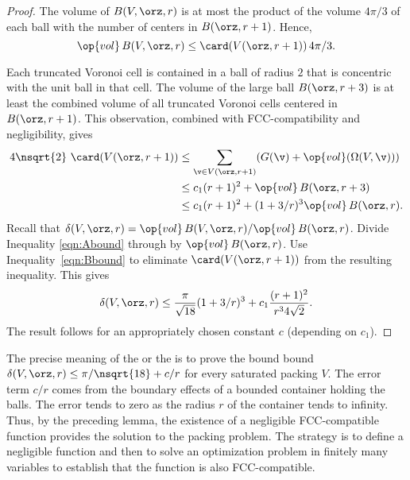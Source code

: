 \begin{proof} 
The volume of $B( V,\orz,r)$ is at most the product of the volume
$4\pi/3$ of each ball with the number of centers in
$B(\orz,r+1)$.  Hence,
\begin{equation} 
\op{vol}\, B( V,\orz,r) \le \card( V(\orz,r+1))\, 4\pi/3.
\label{eqn:Abound}
\end{equation}

Each truncated Voronoi cell is contained in a ball of radius $2$ that
is concentric with the unit ball in that cell.  The volume of the
large ball $B(\orz,r+3)$ is at least the combined volume of all
truncated Voronoi cells centered in $B(\orz,r+1)$. This observation,
combined with FCC-compatibility and negligibility, gives
\begin{equation} 
\begin{split} 
4\nsqrt{2}\,\,\card( V(\orz,r+1))
&\le \sum_{\v\in V(\orz,r+1)} (G(\v) +
\op{vol}(\Omega(V,\v))) \\
&\le c_1 (r+1)^2 + \op{vol}\,B(\orz,r+3) \\
&\le c_1 (r+1)^2 + (1+3/r)^3 \op{vol}\,B(\orz,r).
\label{eqn:Bbound}
\end{split}
\end{equation}
%
Recall that $\delta( V,\orz,r)=
\op{vol}\,B( V,\orz,r)/\op{vol}\,B(\orz,r)$. Divide Inequality
\ref{eqn:Abound} through by $\op{vol}\,B(\orz,r)$.  Use
Inequality~\ref{eqn:Bbound} to eliminate $\card( V(\orz,r+1))$ from the
resulting inequality.  This gives
\[ \delta( V,\orz,r)
\le \frac{\pi}{\sqrt{18}} (1+3/r)^3 + c_1 \frac{(r+1)^2}{r^34\sqrt{2}}.
\] 
The result follows for an appropriately chosen constant $c$
(depending on $c_1$).
\end{proof}

\begin{remark}
\label{remark:precise} 
The precise meaning of the  or the
 is to prove the bound bound $\delta(
V,\orz,r) \le \pi/\nsqrt{18} + c/r$ for every saturated packing $ V$.
The error term $c/r$ comes from the boundary effects of a bounded
container holding the balls.  The error tends to zero as the radius
$r$ of the container tends to infinity.  Thus, by the preceding lemma,
the existence of a negligible FCC-compatible function provides the
solution to the packing problem.  The strategy is to define a
negligible function and then to solve an optimization problem in
finitely many variables to establish that the function is also
FCC-compatible.
\end{remark}





